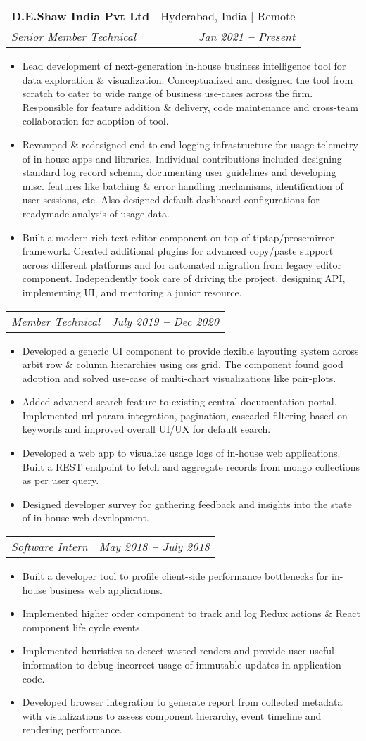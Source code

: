 \documentclass[letterpaper,11pt]{article}
\makeatletter
\newcommand{\resumeItem}[1]{
  \item\small{
    {#1 \vspace{-2pt}}
  }
}
\newcommand{\resumeSubheading}[4]{
  \vspace{-2pt}\item
    \begin{tabular*}{0.97\textwidth}[t]{l@{\extracolsep{\fill}}r}
      \textbf{#1} & #2 \\
      \textit{\small#3} & \textit{\small #4} \\
    \end{tabular*}\vspace{-7pt}
}
\newcommand{\resumeSubSubheading}[2]{
    \vspace{-2pt}\item
    \begin{tabular*}{0.97\textwidth}{l@{\extracolsep{\fill}}r}
      \textit{\small#1} & \textit{\small #2} \\
    \end{tabular*}\vspace{-7pt}
}
\newcommand{\resumeItemListStart}{\begin{itemize}}
\newcommand{\resumeItemListEnd}{\end{itemize}\vspace{-5pt}}
\makeatother
\begin{document}
\resumeSubheading
{D.E.Shaw India Pvt Ltd}{Hyderabad, India $|$ Remote}
{Senior Member Technical}{Jan 2021 \textbf{--} Present}
\resumeItemListStart
\resumeItem{Lead development of next-generation in-house business intelligence tool for data exploration \& visualization. Conceptualized and designed the tool from scratch to cater to wide range of business use-cases across the firm. Responsible for feature addition \& delivery, code maintenance and cross-team collaboration for adoption of tool.}
\resumeItem{Revamped \& redesigned end-to-end logging infrastructure for usage telemetry of in-house apps and libraries. Individual contributions included designing standard log record schema, documenting user guidelines and developing misc. features like batching \& error handling mechanisms, identification of user sessions, etc. Also designed default dashboard configurations for readymade analysis of usage data.}
\resumeItem{Built a modern rich text editor component on top of tiptap/prosemirror framework. Created additional plugins for advanced copy/paste support across different platforms and for automated migration from legacy editor component. Independently took care of driving the project, designing API, implementing UI, and mentoring a junior resource.}
\resumeItemListEnd

\resumeSubSubheading
{Member Technical}{July 2019 \textbf{--} Dec 2020}
\resumeItemListStart
\resumeItem{Developed a generic UI component to provide flexible layouting system across arbit row \& column hierarchies using css grid. The component found good adoption and solved use-case of multi-chart visualizations like pair-plots.}
\resumeItem{Added advanced search feature to existing central documentation portal. Implemented url param integration, pagination, cascaded filtering based on keywords and improved overall UI/UX for default search.}
\resumeItem{Developed a web app to visualize usage logs of in-house web applications. Built a REST endpoint to fetch and aggregate records from mongo collections as per user query.}
\resumeItem{Designed developer survey for gathering feedback and insights into the state of in-house web development.}
\resumeItemListEnd

\resumeSubSubheading
{Software Intern}{May 2018 \textbf{--} July 2018}
\resumeItemListStart
\resumeItem{Built a developer tool to profile client-side performance bottlenecks for in-house business web applications.}
\resumeItem{Implemented higher order component to track and log Redux actions \& React component life cycle events.}
\resumeItem{Implemented heuristics to detect wasted renders and provide user useful information to debug incorrect usage of immutable updates in application code.}
\resumeItem{Developed browser integration to generate report from collected metadata with visualizations to assess component hierarchy, event timeline and rendering performance.}
\resumeItemListEnd
\end{document}
